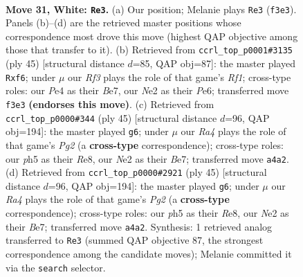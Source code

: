 \documentclass[11pt]{article}
\begin{document}
\clearpage

\begin{figure}[p]\centering
\begin{subfigure}{0.46\textwidth}\centering
\resizebox{\linewidth}{!}{%
\newchessgame
\chessboard[
  setfen={1r3b2/n3rk2/p2p2p1/3P1p1p/Rpq1P3/5R1P/1Q1BNPP1/5K2 w - - 0 31},
  showmover=false,
  pgfstyle=straightmove, color=movearrow, markmove={f3-e3}
]}
\caption{}
\end{subfigure}\hfill
\begin{subfigure}{0.46\textwidth}\centering
\resizebox{\linewidth}{!}{%
\newchessgame
\chessboard[
  setfen={5rk1/1p1rb1p1/p1p1pPqp/8/PP1P4/2P2R2/4Q1PP/R5BK b - - 0 23},
  showmover=false,
  pgfstyle=straightmove, color=movearrow, markmove={f8-f6}
]}
\caption{}
\end{subfigure}
\\[4pt]
\begin{subfigure}{0.46\textwidth}\centering
\resizebox{\linewidth}{!}{%
\newchessgame
\chessboard[
  setfen={4r1k1/4bppp/p2p4/1pr3P1/q1P1Qp1P/3B1P2/PP6/1KR4R b - - 6 23},
  showmover=false,
  pgfstyle=straightmove, color=movearrow, markmove={g7-g6}
]}
\caption{}
\end{subfigure}\hfill
\begin{subfigure}{0.46\textwidth}\centering
\resizebox{\linewidth}{!}{%
\newchessgame
\chessboard[
  setfen={4r1k1/4bppp/p2p4/1pr3P1/q1P1Qp1P/3B1P2/PP6/1KR4R b - - 6 23},
  showmover=false,
  pgfstyle=straightmove, color=movearrow, markmove={g7-g6}
]}
\caption{}
\end{subfigure}
\caption{\textbf{Move 31, White: \texttt{Re3}.} (a) Our position; Melanie plays \texttt{Re3} (\texttt{f3e3}). Panels (b)--(d) are the retrieved master positions whose correspondence most drove this move (highest QAP objective among those that transfer to it). (b) Retrieved from \texttt{ccrl\_top\_p0001\#3135} (ply 45) [structural distance $d$=85, QAP obj=87]: the master played \texttt{Rxf6}; under $\mu$ our \emph{Rf3} plays the role of that game's \emph{Rf1}; cross-type roles: our \emph{P}e4 as their \emph{B}e7, our \emph{N}e2 as their \emph{P}e6; transferred move \texttt{f3e3} \textbf{(endorses this move)}. (c) Retrieved from \texttt{ccrl\_top\_p0000\#344} (ply 45) [structural distance $d$=96, QAP obj=194]: the master played \texttt{g6}; under $\mu$ our \emph{Ra4} plays the role of that game's \emph{Pg2} (a \textbf{cross-type} correspondence); cross-type roles: our \emph{p}h5 as their \emph{R}e8, our \emph{N}e2 as their \emph{B}e7; transferred move \texttt{a4a2}. (d) Retrieved from \texttt{ccrl\_top\_p0000\#2921} (ply 45) [structural distance $d$=96, QAP obj=194]: the master played \texttt{g6}; under $\mu$ our \emph{Ra4} plays the role of that game's \emph{Pg2} (a \textbf{cross-type} correspondence); cross-type roles: our \emph{p}h5 as their \emph{R}e8, our \emph{N}e2 as their \emph{B}e7; transferred move \texttt{a4a2}. Synthesis: 1 retrieved analog transferred to \texttt{Re3} (summed QAP objective 87, the strongest correspondence among the candidate moves); Melanie committed it via the \texttt{search} selector.}
\label{fig:thought-m60}
\end{figure}
\end{document}
